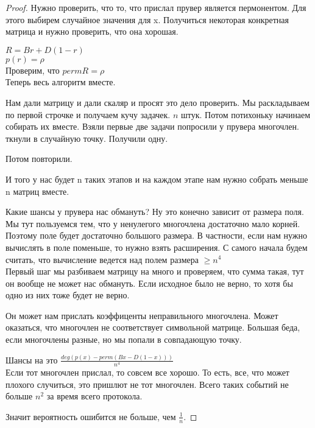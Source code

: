 \begin{proof}
	Нужно проверить, что то, что прислал прувер является пермонентом. Для этого выбирем 
	случайное значения для x. Получиться некоторая конкретная матрица и нужно проверить, что она хорошая. 
	
	$R = Br + D(1 - r)$\\
	$p(r) = \rho$\\
	
	Проверим, что $perm R = \rho$\\
                                                                  
	Теперь весь алгоритм вместе. 

	Нам дали матрицу и дали скаляр и просят это дело проверить. Мы раскладываем 
	по первой строчке и получаем кучу задачек. $n$ штук. Потом потихоньку начинаем
	собирать их вместе. Взяли первые две задачи попросили у прувера многочлен.
	ткнули в случайную точку. Получили одну.

	Потом повторили.

	И того у нас будет n таких этапов и на каждом этапе нам нужно собрать меньше n матриц вместе.

	Какие шансы у прувера нас обмануть? Ну это конечно зависит от размера поля. 
	Мы тут пользуемся тем, что у ненулегого многочлена достаточно мало корней. Поэтому поле будет
	достаточно большого размера. В частности, если нам нужно вычислять в поле поменьше, то нужно взять расширения. 
	С самого начала будем считать, что вычисление ведется над полем размера $\ge n^4$\\

	Первый шаг мы разбиваем матрицу на много и проверяем, что сумма такая, 
	тут он вообще не может нас обмануть. Если исходное было не верно, 
	то хотя бы одно из них тоже будет не верно. 

	Он может нам прислать коэффиценты неправильного многочлена. Может 
	оказаться, что многочлен не соответствует символьной матрице. Большая
	беда, если многочлены разные, но мы попали в совпадающую точку.

	Шансы на это $\frac{deg(p(x) - perm(Bx - D(1 - x)))}{n^4}$\\

	Если тот многочлен прислал, то совсем все хорошо. То есть, все, что может
	плохого случиться, это пришлют не тот многочлен. Всего таких событий не
	больше $n^2$  за время всего протокола.

	Значит вероятность ошибится не больше, чем $\frac{1}{n}$.         
\end{proof}

